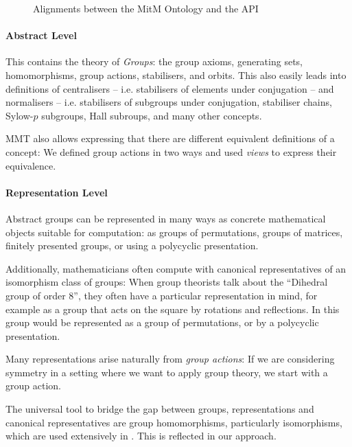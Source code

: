 \begin{figure}[ht]\centering
  \caption{Alignments between the MitM Ontology and the \GAP API}\label{fig:cgtontology}
\end{figure}
\paragraph{Abstract Level} This contains the theory of \emph{Groups}: the group axioms, generating sets, homomorphisms, group actions, stabilisers, and orbits.  
This also easily leads into definitions of centralisers -- i.e. stabilisers of elements under conjugation -- and normalisers -- i.e. stabilisers of subgroups under conjugation, stabiliser chains, Sylow-$p$ subgroups, Hall subroups, and many other concepts.

MMT also allows expressing that there are different equivalent definitions of a
concept: We defined group actions in two ways and used \emph{views} to express
their equivalence.

\paragraph{Representation Level} 
Abstract groups can be represented in many ways as concrete mathematical
objects suitable for computation: as groups of permutations, groups of matrices,
finitely presented groups, or using a polycyclic presentation.

Additionally, mathematicians often compute with canonical representatives of an isomorphism class of groups: When group theorists talk about the ``Dihedral group of order 8'', they often have a particular representation in mind, for example as a group that acts on the square by rotations and reflections. 
In \GAP this group would be represented as a group of permutations, or by a polycyclic presentation.

Many representations arise naturally from \emph{group actions}: If we are
considering symmetry in a setting where we want to apply group theory, we start
with a group action.

The universal tool to bridge the gap between groups, representations and
canonical representatives are group homomorphisms, particularly isomorphisms,
which are used extensively in \GAP. This is reflected in our approach.

